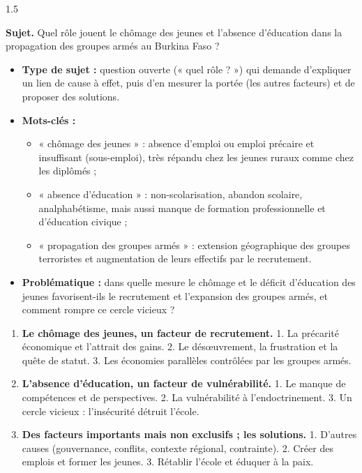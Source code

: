 \documentclass[12pt]{article}
\begin{document}
\begin{spacing}{1.5}

\noindent\textbf{Sujet.} Quel rôle jouent le chômage des jeunes et l'absence d'éducation dans la propagation des groupes armés au Burkina Faso ?


\begin{itemize}
\item \textbf{Type de sujet :} question ouverte (« quel rôle ? ») qui demande d'expliquer un lien de cause à effet, puis d'en mesurer la portée (les autres facteurs) et de proposer des solutions.
\item \textbf{Mots-clés :}
  \begin{itemize}
  \item « chômage des jeunes » : absence d'emploi ou emploi précaire et insuffisant (sous-emploi), très répandu chez les jeunes ruraux comme chez les diplômés ;
  \item « absence d'éducation » : non-scolarisation, abandon scolaire, analphabétisme, mais aussi manque de formation professionnelle et d'éducation civique ;
  \item « propagation des groupes armés » : extension géographique des groupes terroristes et augmentation de leurs effectifs par le recrutement.
  \end{itemize}
\item \textbf{Problématique :} dans quelle mesure le chômage et le déficit d'éducation des jeunes favorisent-ils le recrutement et l'expansion des groupes armés, et comment rompre ce cercle vicieux ?
\end{itemize}


\begin{enumerate}
\item[I.] \textbf{Le chômage des jeunes, un facteur de recrutement.} 1. La précarité économique et l'attrait des gains. 2. Le désœuvrement, la frustration et la quête de statut. 3. Les économies parallèles contrôlées par les groupes armés.
\item[II.] \textbf{L'absence d'éducation, un facteur de vulnérabilité.} 1. Le manque de compétences et de perspectives. 2. La vulnérabilité à l'endoctrinement. 3. Un cercle vicieux : l'insécurité détruit l'école.
\item[III.] \textbf{Des facteurs importants mais non exclusifs ; les solutions.} 1. D'autres causes (gouvernance, conflits, contexte régional, contrainte). 2. Créer des emplois et former les jeunes. 3. Rétablir l'école et éduquer à la paix.
\end{enumerate}


\end{spacing}
\end{document}
